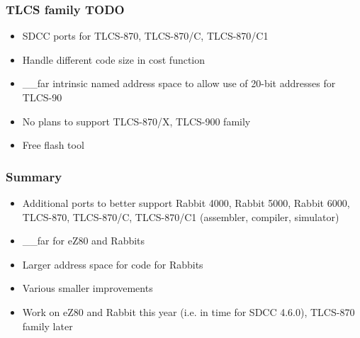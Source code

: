 \documentclass[xcolor=dvipsnames]{beamer}
\begin{document}
\begin{frame}
	\frametitle{TLCS family TODO}
	\begin{itemize}
		\item SDCC ports for TLCS-870, TLCS-870/C, TLCS-870/C1
		\item Handle different code size in cost function
		\item \_\_far intrinsic named address space to allow use of 20-bit addresses for TLCS-90
		\item No plans to support TLCS-870/X, TLCS-900 family
		\item Free flash tool
	\end{itemize}
\end{frame}

\begin{frame}
	\frametitle{Summary}
	\begin{itemize}
		\item Additional ports to better support Rabbit 4000, Rabbit 5000, Rabbit 6000, TLCS-870, TLCS-870/C, TLCS-870/C1 (assembler, compiler, simulator)
		\item \_\_far for eZ80 and Rabbits
		\item Larger address space for code for Rabbits
		\item Various smaller improvements
		\item Work on eZ80 and Rabbit this year (i.e. in time for SDCC 4.6.0), TLCS-870 family later
	\end{itemize}
\end{frame}
\end{document}

